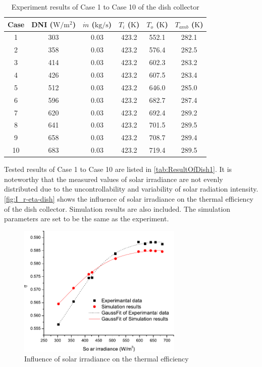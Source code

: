 \begin{table}[htbp]\footnotesize
	\caption{Experiment results of Case 1 to Case 10 of the dish collector}
	\centering
	\begin{tabular}{cccccc}
		\toprule
		Case	& DNI ($\mathrm{W/m^2}$)	&	$\dot{m}$ ($\mathrm{kg/s}$)			&	$T_i$ ($\mathrm{K}$)	&	$T_o$ ($\mathrm{K}$)		&	$T_{amb}$ ($\mathrm{K}$)\\
		\midrule
		1	&	303	&	0.03	&	423.2	&	552.1	&	282.1\\
		2	&	358	&	0.03	&	423.2	&	576.4	&	282.5\\
		3	&	414	&	0.03	&	423.2	&	602.3	&	283.2	\\
		4	&	426	&	0.03	&	423.2	&	607.5	&	283.4\\
		5	&	512	&	0.03	&	423.2	&	646.0	&	285.0\\
		6	&	596	&	0.03	&	423.2	&	682.7	&	287.4\\
		7	&	620	&	0.03	&	423.2	&	692.4	&	289.2\\
		8	&	641	&	0.03	&	423.2	&	701.5	&	289.5\\
		9	&	658	&	0.03	&	423.2	&	708.7	&	289.4\\
		10	&	683	&	0.03	&	423.2	&	719.4	&	289.5\\
		\bottomrule
	\end{tabular}
	
	\label{tab:ResultOfDish1}
\end{table}
Tested results of Case 1 to Case 10 are listed in \autoref{tab:ResultOfDish1}. It is noteworthy that the measured values of solar irradiance are not evenly distributed due to the uncontrollability and variability of solar radiation intensity.
\autoref{fig:I_r-eta-dish} shows the influence of solar irradiance on the thermal efficiency of the dish collector. Simulation results are also included. The simulation parameters are set to be the same as the experiment. 
\begin{figure}[!ht]
\centering
\includegraphics[width=0.7\textwidth]{fig/I_r-eta-dish}
\caption{Influence of solar irradiance on the thermal efficiency}
\label{fig:I_r-eta-dish}
\end{figure}

